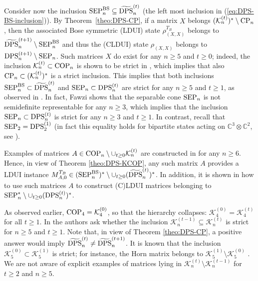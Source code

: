 \documentclass[11pt]{article}
\newcommand{\C}{\ensuremath{\mathbb{C}}} %
\newcommand{\MK}{{\mathcal K}}
\newcommand{\SEP}{\text{\rm SEP}}
\newcommand{\CP}{\text{\rm CP}}
\newcommand{\COP}{\text{\rm COP}}
\newcommand{\DPS}{\text{\rm DPS}}
\newcommand{\SEPBS}{\SEP^{\BS}}
\newcommand{\tilDPS}{\widetilde {\DPS}}
\newcommand{\ot}{\otimes}
\newcommand{\BS}{\text{\rm BS}}
\theoremstyle{plain}
\newcommand{\ML}{\textcolor{blue}}
\begin{document}
\medskip
Consider now the inclusion $\SEPBS_n\subseteq \tilDPS^{(t)}_n$ (the left most inclusion in (\ref{eq:DPS-BS-inclusion})).
By  Theorem~\ref{theo:DPS-CP}, if a matrix $X$ belongs $(\MK^{(t)}_n)^*\setminus \CP_n$, then the associated Bose symmetric (LDUI) state $\rho_{(X,X)}^{T_B}$ belongs to ${\tilDPS^{(t+1)}_n}\setminus \SEPBS_n$ and thus the (CLDUI) state $\rho_{(X,X)}$ belongs to $\DPS^{(t+1)}_n\setminus \SEP_n$. Such  matrices $X$ do exist for any $n\ge 5$ and $t\ge 0$;
indeed, the inclusion $\MK^{(t)}_n\subset \COP_n$ is  shown to be strict in \cite{DDGH_2013}, which implies that also  $\CP_n\subset (\MK^{(t)}_n)^*$ is a strict inclusion. This   implies that   both inclusions $\SEPBS_n\subset {\tilDPS^{(t)}_n}$ and $\SEP_n\subset \DPS^{(t)}_n$ are strict  for any $n\ge 5$ and $t\ge 1$, as observed in \cite{GNP_2025}. In fact,  Fawzi \cite{Fawzi-SEP} shows that the separable cone $\SEP_n$ is not semidefinite representable for any $n\ge 3$, which implies that the inclusion $\SEP_n\subset \DPS^{(t)}_n$ is strict for any $n\ge 3$ and $t\ge 1$. In contrast, recall that $\SEP_2=\DPS^{(1)}_2$ (in fact this equality holds for bipartite states acting on $\C^3\ot \C^2$, see \cite{Woronowicz}). 

{Examples of matrices $A\in \COP_n\setminus \cup_{t\ge 0}\MK^{(t)}_n$ are constructed in \cite{Laurent-Vargas_2023} for any $n\ge 6$. Hence, in view of Theorem \ref{theo:DPS-KCOP}, any such matrix $A$ provides a LDUI instance {$M^{T_B}_{A,0}\in (\SEP^\BS_n)^*\setminus \cup_{t\ge 0} (\tilDPS^{(t)}_n)^*$}. In addition, it is shown in \cite[Theorem 8.5]{GNP_2025} how to use such matrices $A$ to construct  (C)LDUI matrices 
belonging to $\SEP_n^* \setminus \cup_{t\ge 0} (\DPS^{(t)}_n)^*$.
}

\medskip
As observed earlier, $\COP_4 = \MK^{(0)}_4$, so that the hierarchy collapses: $\MK^{(0)}_4=\MK^{(t)}_4$ for all $t\ge 1$. In \cite[Question 8.21]{GNP_2025} the authors ask whether the inclusion $\MK^{(t-1)}_n \subseteq \MK^{(t)}_n$ is strict for $n\ge 5$ and $t\ge 1$. Note that, in view of Theorem \ref{theo:DPS-CP}, a positive answer would  imply  {$\tilDPS^{(t)}_n\not=\tilDPS^{(t+1)}_n$.}
It is known that the inclusion $\MK^{(0)}_5\subset \MK^{(1)}_5$ is strict; for instance, the  Horn matrix belongs to  $\MK^{(1)}_5\setminus \MK^{(0)}_5$ \cite{Parrilo_2000}.
We are not aware of explicit examples of matrices lying in $\MK^{(t)}_n\setminus \MK^{(t-1)}_n$ for $t\ge 2$ and $n\ge 5$.
\end{document}
